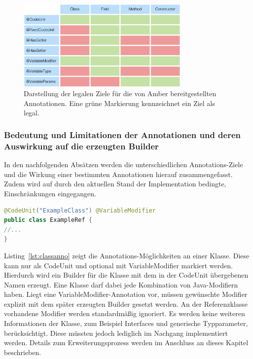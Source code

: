 \documentclass[12pt,oneside,a4paper,parskip]{scrbook}
\begin{document}
\begin{figure}[htbp]
\centering
\includegraphics[width=0.75\textwidth]{bilder/tblAnnoTrgt}
\caption{Darstellung der legalen Ziele für die von Amber bereitgestellten Annotationen. Eine grüne Markierung kennzeichnet ein Ziel als legal.}
\label{fig:tblAnnoTrgt}
\end{figure}

\subsubsection{Bedeutung und Limitationen der Annotationen und deren Auswirkung auf die erzeugten Builder}

In den nachfolgenden Absätzen werden die unterschiedlichen Annotations-Ziele und die Wirkung einer bestimmten Annotationen hierauf zusammengefasst. Zudem wird auf durch den aktuellen Stand der Implementation bedingte, Einschränkungen eingegangen.

\begin{lstlisting}[label=lst:classanno,
language=java,
firstnumber=1,
caption=Darstellung der Annotations-Möglichkeiten an einer Klasse.]
@CodeUnit("ExampleClass") @VariableModifier
public class ExampleRef {
//...
}
\end{lstlisting}

Listing~\ref{lst:classanno} zeigt die Annotations-Möglichkeiten an einer Klasse. Diese kann nur als CodeUnit und optional mit VariableModifier markiert werden. Hierdurch wird ein Builder für die Klasse mit dem in der CodeUnit übergebenen Namen erzeugt. Eine Klasse darf dabei jede Kombination von Java-Modifiern haben. Liegt eine VariableModifier-Annotation vor, müssen gewünschte Modifier explizit mit dem später erzeugten Builder gesetzt werden. An der Referenzklasse vorhandene Modifier werden standardmäßig ignoriert. Es werden keine weiteren Informationen der Klasse, zum Beispiel Interfaces und generische Typparameter, berücksichtigt. Diese müssten jedoch lediglich im Nachgang implementiert werden. Details zum Erweiterungsprozess werden im Anschluss an dieses Kapitel beschrieben.
\end{document}
